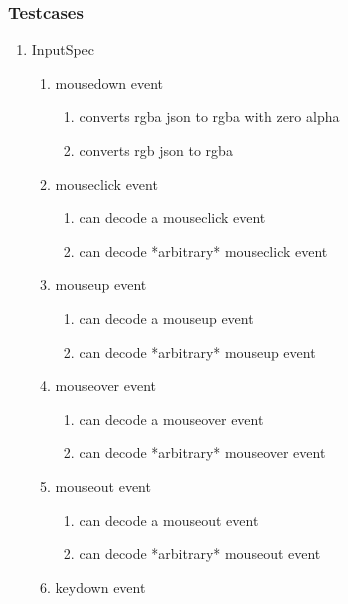 \subsubsection{Testcases}
\begin{enumerate}[label={T\arabic*}]
	\setcounter{enumi}{\value{startvaluetest}}
	\item InputSpec
	\begin{enumerate}[label={T\arabic{enumi}.\arabic*}]
		\item mousedown event
		\begin{enumerate}[label={T\arabic{enumi}.\arabic{enumii}.\arabic*}]
			\item converts rgba json to rgba with zero alpha
			\item converts rgb json to rgba
		\end{enumerate}
		\item mouseclick event
		\begin{enumerate}[label={T\arabic{enumi}.\arabic{enumii}.\arabic*}]
			\item can decode a mouseclick event
			\item can decode *arbitrary* mouseclick event
		\end{enumerate}
		\item mouseup event
		\begin{enumerate}[label={T\arabic{enumi}.\arabic{enumii}.\arabic*}]
			\item can decode a mouseup event
			\item can decode *arbitrary* mouseup event
		\end{enumerate}
		\item mouseover event
		\begin{enumerate}[label={T\arabic{enumi}.\arabic{enumii}.\arabic*}]
			\item can decode a mouseover event
			\item can decode *arbitrary* mouseover event
		\end{enumerate}
		\item mouseout event
		\begin{enumerate}[label={T\arabic{enumi}.\arabic{enumii}.\arabic*}]
			\item can decode a mouseout event
			\item can decode *arbitrary* mouseout event
		\end{enumerate}
		\item keydown event
		\begin{enumerate}[label={T\arabic{enumi}.\arabic{enumii}.\arabic*}]

\end{enumerate}
\end{enumerate}
\end{enumerate}
